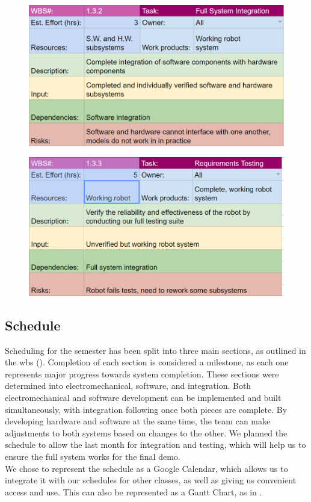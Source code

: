 \begin{figure}[h!]
\centering
\includegraphics[width=0.98\columnwidth]{wbs_schedule/wbs_dict_int2.PNG}
\label{fig:int1}
\end{figure}
\begin{figure}[h!]
\centering
\includegraphics[width=0.98\columnwidth]{wbs_schedule/wbs_dict_int3.PNG}
\label{fig:int1}
\end{figure}

\clearpage

\subsection{Schedule}
\label{sec:schedule}
Scheduling for the semester has been split into three main sections, as outlined in the wbs (). Completion of each section is considered a milestone, as each one represents major progress towards system completion. These sections were determined into electromechanical, software, and integration. Both electromechanical and software development can be implemented and built simultaneously, with integration following once both pieces are complete. By developing hardware and software at the same time, the team can make adjustments to both systems based on changes to the other. We planned the schedule to allow the last month for integration and testing, which will help us to ensure the full system works for the final demo. \\
We chose to represent the schedule as a Google Calendar, which allows us to integrate it with our schedules for other classes, as well as giving us convenient access and use. This can also be represented as a Gantt Chart, as in .

